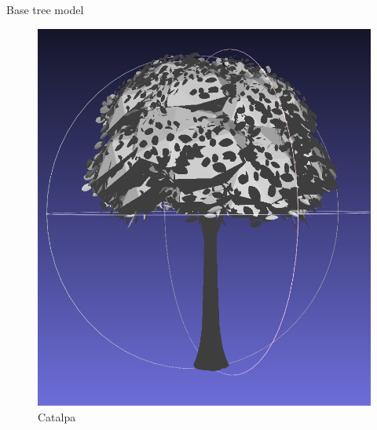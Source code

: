 \documentclass[10pt]{beamer}
\begin{document}
\begin{frame}{Base tree model}
\begin{figure}[H]
\begin{minipage}{0.24\textwidth}
        \includegraphics[width=\textwidth]{images/catalpa.png}
        \caption{Catalpa}
    \end{minipage}
\end{figure}


\end{frame}
\end{document}
